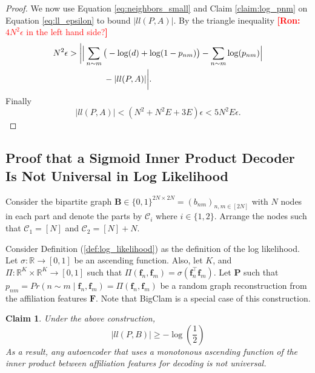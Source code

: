 \documentclass[letterpaper]{article} %
\newtheorem{claim}[theorem]{Claim}
\newcommand{\ron}[1]{{{\textcolor{red}{\textbf{[Ron:} {#1}\textbf{]}}}}}
\begin{document}
\begin{proof}
    We now use Equation \ref{eq:neighbors_small} and Claim \ref{claim:log_pnm} on Equation \ref{eq:ll_epsilon} to bound $|ll(P,A)|$. By the triangle inequality
    \ron{$4N^2\epsilon$ in the left hand side?}
    \begin{align}
        &N^2\epsilon >   \bigg|\Big|\sum_{\substack{n\sim m}}\big(-\log(d) + \log(1-p_{nm})\big) - \sum_{\substack{n\sim m}}\log(p_{nm})\Big| \notag\\ 
        &\quad\quad\quad\quad\quad\quad  - |ll(P,A)|\bigg|.
    \end{align}
    Finally
    \[|ll(P,A)| < (N^2 + N^2E + 3E)\epsilon< 5N^2E\epsilon.\]
    

\end{proof}

\subsection{Proof that a Sigmoid Inner Product Decoder Is Not Universal in Log Likelihood}
Consider the bipartite graph $\mathbf{B}\in \{0,1\}^{2N\times 2N} = (b_{nm})_{n,m \in [2N]}$ with $N$ nodes in each part and denote the parts by $\mathcal{C}_i$ where $i\in \{1,2\}$. Arrange the nodes such that $\mathcal{C}_1 = [N]$ and $\mathcal{C}_2 = [N]+ N$. 



Consider Definition (\ref{def:log_likelihood}) as the definition of the log likelihood. Let $\sigma: \mathbb{R} \rightarrow [0,1]$ be an ascending function.
Also, let $K$, and $\Pi: \mathbb{R}^K \times \mathbb{R}^K \rightarrow [0,1]$ such that $\Pi(\mathbf{f}_n, \mathbf{f}_m) = \sigma(\mathbf{f}_n^\top \mathbf{f}_m)$.
Let $\mathbf{P}$ such that $p_{nm} = Pr(n\sim m \mid \mathbf{f}_n, \mathbf{f}_m) = \Pi(\mathbf{f}_n, \mathbf{f}_m)$ be a random graph reconstruction from the affiliation features $\mathbf{F}$. Note that BigClam is a special case of this construction.

\begin{claim}
    Under the above construction, 
    \[|ll(P,B)| \geq -\log(\frac{1}{2})\]
    As a result, any autoencoder that uses a monotonous ascending function of the inner product between affiliation features for decoding is not universal.
\end{claim}
 
\end{document}
